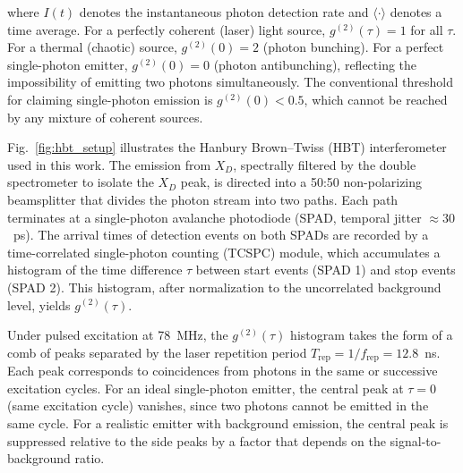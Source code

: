 where $I(t)$ denotes the instantaneous photon detection rate and $\langle \cdot \rangle$ denotes a time average. For a perfectly coherent (laser) light source, $g^{(2)}(\tau) = 1$ for all $\tau$. For a thermal (chaotic) source, $g^{(2)}(0) = 2$ (photon bunching). For a perfect single-photon emitter, $g^{(2)}(0) = 0$ (photon antibunching), reflecting the impossibility of emitting two photons simultaneously. The conventional threshold for claiming single-photon emission is $g^{(2)}(0) < 0.5$, which cannot be reached by any mixture of coherent sources.

Fig.~\ref{fig:hbt_setup} illustrates the Hanbury Brown--Twiss (HBT) interferometer used in this work. The emission from $X_D$, spectrally filtered by the double spectrometer to isolate the $X_D$ peak, is directed into a 50:50 non-polarizing beamsplitter that divides the photon stream into two paths. Each path terminates at a single-photon avalanche photodiode (SPAD, temporal jitter $\approx 30$~ps). The arrival times of detection events on both SPADs are recorded by a time-correlated single-photon counting (TCSPC) module, which accumulates a histogram of the time difference $\tau$ between start events (SPAD 1) and stop events (SPAD 2). This histogram, after normalization to the uncorrelated background level, yields $g^{(2)}(\tau)$.

Under pulsed excitation at 78~MHz, the $g^{(2)}(\tau)$ histogram takes the form of a comb of peaks separated by the laser repetition period $T_{\mathrm{rep}} = 1/f_{\mathrm{rep}} = 12.8$~ns. Each peak corresponds to coincidences from photons in the same or successive excitation cycles. For an ideal single-photon emitter, the central peak at $\tau = 0$ (same excitation cycle) vanishes, since two photons cannot be emitted in the same cycle. For a realistic emitter with background emission, the central peak is suppressed relative to the side peaks by a factor that depends on the signal-to-background ratio.



